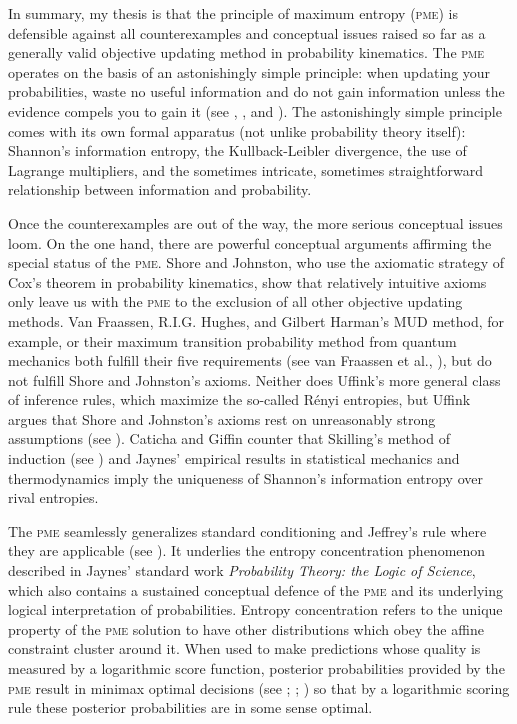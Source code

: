 In summary, my thesis is that the principle of maximum entropy
(\textsc{pme}) is defensible against all counterexamples and
conceptual issues raised so far as a generally valid objective
updating method in probability kinematics. The \textsc{pme} operates
on the basis of an astonishingly simple principle: when updating your
probabilities, waste no useful information and do not gain information
unless the evidence compels you to gain it (see
, , and
). The astonishingly simple principle comes
with its own formal apparatus (not unlike probability theory itself):
Shannon's information entropy, the Kullback-Leibler divergence, the
use of Lagrange multipliers, and the sometimes intricate, sometimes
straightforward relationship between information and probability.

Once the counterexamples are out of the way, the more serious
conceptual issues loom. On the one hand, there are powerful conceptual
arguments affirming the special status of the \textsc{pme}. Shore and
Johnston, who use the axiomatic strategy of Cox's theorem in
probability kinematics, show that relatively intuitive axioms only
leave us with the \textsc{pme} to the exclusion of all other objective
updating methods. Van Fraassen, R.I.G. Hughes, and Gilbert Harman's
MUD method, for example, or their maximum transition probability
method from quantum mechanics both fulfill their five requirements
(see van Fraassen et al., ), but do not
fulfill Shore and Johnston's axioms. Neither does Uffink's more
general class of inference rules, which maximize the so-called
R{\'e}nyi entropies, but Uffink argues that Shore and Johnston's
axioms rest on unreasonably strong assumptions (see
). Caticha and Giffin counter that Skilling's
method of induction (see ) and Jaynes'
empirical results in statistical mechanics and thermodynamics imply
the uniqueness of Shannon's information entropy over rival entropies.

The \textsc{pme} seamlessly generalizes standard conditioning and
Jeffrey's rule where they are applicable (see
). It underlies the entropy concentration
phenomenon described in Jaynes' standard work \emph{Probability
  Theory: the Logic of Science}, which also contains a sustained
conceptual defence of the \textsc{pme} and its underlying logical
interpretation of probabilities. Entropy concentration refers to the
unique property of the \textsc{pme} solution to have other
distributions which obey the affine constraint cluster around it. When
used to make predictions whose quality is measured by a logarithmic
score function, posterior probabilities provided by the \textsc{pme}
result in minimax optimal decisions (see ;
; ) so that by a
logarithmic scoring rule these posterior probabilities are in some
sense optimal.

